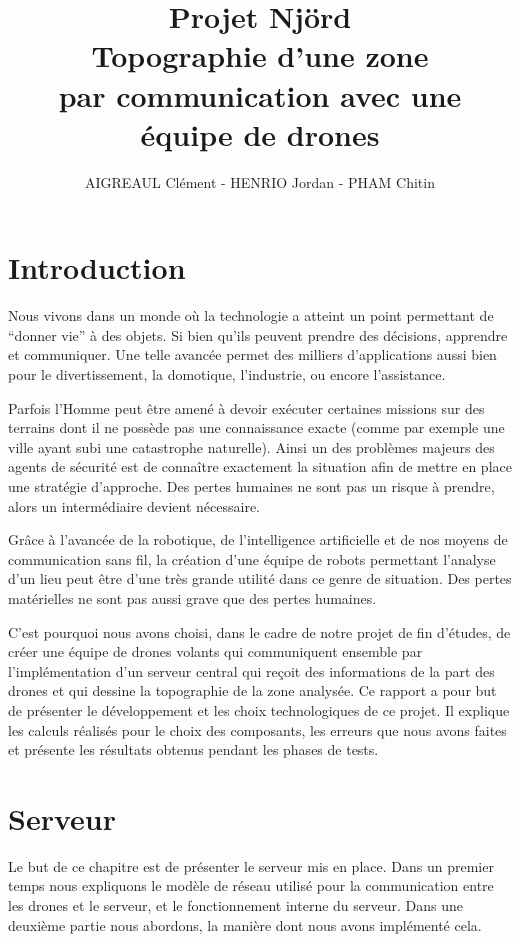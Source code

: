 \documentclass[a4paper,10pt]{report}
\title{\textbf{Projet Njörd}\\ Topographie d'une zone \\ par communication avec 
une équipe de drones}
\author{AIGREAUL Clément - HENRIO Jordan - PHAM Chitin}
\begin{document}
  \maketitle

  \chapter*{Introduction}
    Nous vivons dans un monde où la technologie a atteint un point permettant 
de “donner vie” à des objets. Si bien qu’ils peuvent prendre des décisions, 
apprendre et communiquer. Une telle avancée permet des milliers d’applications 
aussi bien pour le divertissement, la domotique, l’industrie, ou encore 
l’assistance.
    
    Parfois l’Homme peut être amené à devoir exécuter certaines missions sur 
des terrains dont il ne possède pas une connaissance exacte (comme par exemple 
une ville ayant subi une catastrophe naturelle). Ainsi un des problèmes majeurs 
des agents de sécurité est de connaître exactement la situation afin de mettre 
en place une stratégie d’approche. Des pertes humaines ne sont pas un risque à 
prendre, alors un intermédiaire devient nécessaire. 

    Grâce à l'avancée de la robotique, de l'intelligence artificielle et de nos 
moyens de communication sans fil, la création d’une équipe de robots permettant 
l’analyse d’un lieu peut être d’une très grande utilité dans ce genre de 
situation. Des pertes matérielles ne sont pas aussi grave que des pertes 
humaines. 

  C'est pourquoi nous avons choisi, dans le cadre de notre projet de fin 
d'études, de créer une équipe de drones volants qui communiquent ensemble par 
l'implémentation d'un serveur central qui reçoit des informations de la part 
des drones et qui dessine la topographie de la zone analysée. Ce rapport a pour 
but de présenter le développement et les choix technologiques de ce projet. Il 
explique les calculs réalisés pour le choix des composants, les erreurs que 
nous avons faites et présente les résultats obtenus pendant les phases de tests.
  
  \tableofcontents
  
  \chapter{Serveur}
    Le but de ce chapitre est de présenter le serveur mis en place. Dans un 
premier temps nous expliquons le modèle de réseau utilisé pour la communication 
entre les drones et le serveur, et le fonctionnement interne du serveur. Dans 
une deuxième partie nous abordons, la manière dont nous avons implémenté cela.
\end{document}
